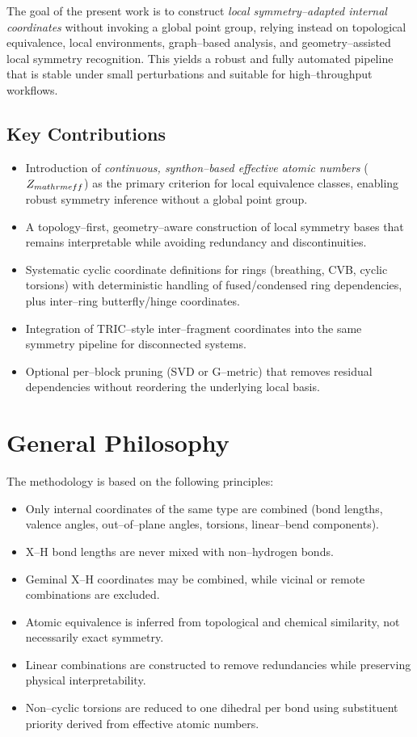 \documentclass[11pt,a4paper]{article}
\begin{document}
The goal of the present work is to construct \emph{local symmetry--adapted
internal coordinates} without invoking a global point group, relying instead on
topological equivalence, local environments, graph--based analysis, and
geometry--assisted local symmetry recognition. This yields a robust and
fully automated pipeline that is stable under small perturbations and suitable
for high--throughput workflows.

\subsection{Key Contributions}
\begin{itemize}
  \item Introduction of \emph{continuous, synthon--based effective atomic numbers}
        ($Z_{\\mathrm{eff}}$) as the primary criterion for local equivalence
        classes, enabling robust symmetry inference without a global point group.
  \item A topology--first, geometry--aware construction of local symmetry bases
        that remains interpretable while avoiding redundancy and discontinuities.
  \item Systematic cyclic coordinate definitions for rings (breathing, CVB,
        cyclic torsions) with deterministic handling of fused/condensed
        ring dependencies, plus inter--ring butterfly/hinge coordinates.
  \item Integration of TRIC--style inter--fragment coordinates into the same
        symmetry pipeline for disconnected systems.
  \item Optional per--block pruning (SVD or G--metric) that removes residual
        dependencies without reordering the underlying local basis.
\end{itemize}

\section{General Philosophy}

The methodology is based on the following principles:

\begin{itemize}
  \item Only internal coordinates of the same type are combined
        (bond lengths, valence angles, out--of--plane angles, torsions,
        linear--bend components).
  \item X--H bond lengths are never mixed with non--hydrogen bonds.
  \item Geminal X--H coordinates may be combined, while vicinal or remote
        combinations are excluded.
  \item Atomic equivalence is inferred from topological and chemical similarity,
        not necessarily exact symmetry.
  \item Linear combinations are constructed to remove redundancies while
        preserving physical interpretability.
  \item Non--cyclic torsions are reduced to one dihedral per bond using
        substituent priority derived from effective atomic numbers.
\end{itemize}
\end{document}

